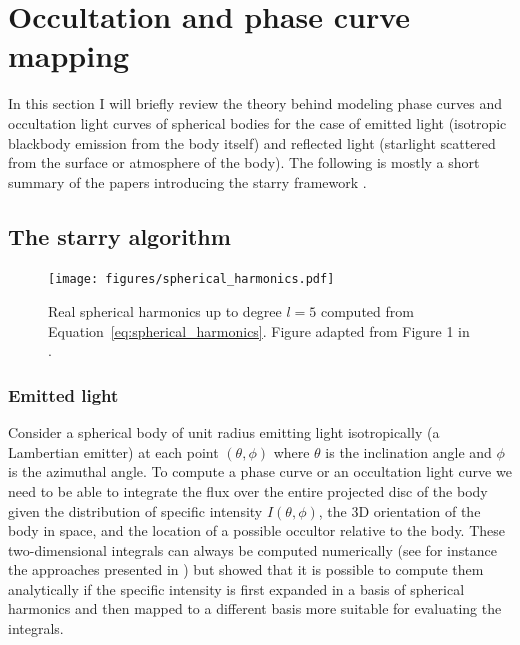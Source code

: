 \documentclass[12pt]{report}
\begin{document}
\section{Occultation and phase curve mapping}
\label{sec:occultations}
In this section I will briefly review the theory behind modeling phase curves and
occultation light curves of spherical bodies for the case of emitted light
(isotropic blackbody emission from the body itself) and reflected light
(starlight scattered from the surface or atmosphere of the body). The following is
mostly a short summary of the papers introducing the \textsf{starry} framework
\citep{2019AJ....157...64L,2021arXiv210306275L}.
\subsection{The starry algorithm}
\begin{figure}[t]
    \begin{centering}
        \texttt{[image: figures/spherical\_harmonics.pdf]}
        \caption{Real spherical harmonics up to degree $l=5$ computed from
            Equation~\ref{eq:spherical_harmonics}. Figure adapted from Figure 1 in
            \citet{2019AJ....157...64L}.}
        \label{fig:spherical_harmonics}
    \end{centering}
\end{figure}
\subsubsection{Emitted light}
Consider a spherical body of unit radius emitting light isotropically (a
Lambertian emitter) at each point $(\theta,\phi)$ where $\theta$ is the
inclination angle and $\phi$ is the azimuthal angle. To compute a phase curve
or an occultation light curve we need to be able to integrate the flux over the
entire projected disc of the body given the distribution of specific intensity
$I(\theta, \phi)$, the 3D orientation of the body in space, and the location of
a possible occultor relative to the body. These two-dimensional integrals can
always be computed numerically (see for instance the approaches presented in
\citet{2018AJ....156..146F,2018MNRAS.477.2613L}) but
\citet{2019AJ....157...64L} showed that it is possible to compute them
analytically if the specific intensity is first expanded in a basis of
spherical harmonics and then mapped to a different basis more suitable for
evaluating the integrals.
\end{document}
